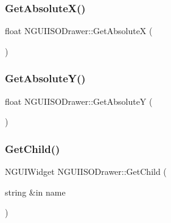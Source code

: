 \hypertarget{class_n_g_u_i_i_s_o_drawer_ab4ca3a35c2c97985c24f707a4d725388}{}\label{class_n_g_u_i_i_s_o_drawer_ab4ca3a35c2c97985c24f707a4d725388} 
\subsubsection{\texorpdfstring{Get\+Absolute\+X()}{GetAbsoluteX()}}
{\footnotesize\ttfamily float N\+G\+U\+I\+I\+S\+O\+Drawer\+::\+Get\+AbsoluteX (\begin{DoxyParamCaption}{ }\end{DoxyParamCaption})}

\hypertarget{class_n_g_u_i_i_s_o_drawer_a37c0a77fc7267faccd1647fd85a4ae7f}{}\label{class_n_g_u_i_i_s_o_drawer_a37c0a77fc7267faccd1647fd85a4ae7f} 
\subsubsection{\texorpdfstring{Get\+Absolute\+Y()}{GetAbsoluteY()}}
{\footnotesize\ttfamily float N\+G\+U\+I\+I\+S\+O\+Drawer\+::\+Get\+AbsoluteY (\begin{DoxyParamCaption}{ }\end{DoxyParamCaption})}

\hypertarget{class_n_g_u_i_i_s_o_drawer_a6bfc832df79d99bf31b6a403a84f3572}{}\label{class_n_g_u_i_i_s_o_drawer_a6bfc832df79d99bf31b6a403a84f3572} 
\subsubsection{\texorpdfstring{Get\+Child()}{GetChild()}\hspace{0.1cm}{\footnotesize\ttfamily [1/2]}}
{\footnotesize\ttfamily N\+G\+U\+I\+Widget N\+G\+U\+I\+I\+S\+O\+Drawer\+::\+Get\+Child (\begin{DoxyParamCaption}\item[{string \&in}]{name }\end{DoxyParamCaption})}

\hypertarget{class_n_g_u_i_i_s_o_drawer_a4bc5a82bf2cb380d267e3441ec8b54b6}{}\label{class_n_g_u_i_i_s_o_drawer_a4bc5a82bf2cb380d267e3441ec8b54b6} 
